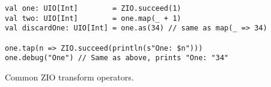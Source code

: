 \begin{algorithm}

\begin{verbatim}
val one: UIO[Int]        = ZIO.succeed(1)
val two: UIO[Int]        = one.map(_ + 1)
val discardOne: UIO[Int] = one.as(34) // same as map(_ => 34)

one.tap(n => ZIO.succeed(println(s"One: $n")))
one.debug("One") // Same as above, prints "One: "34"
\end{verbatim}

\caption{Common ZIO transform operators. \label{zio:transform}}
\end{algorithm}